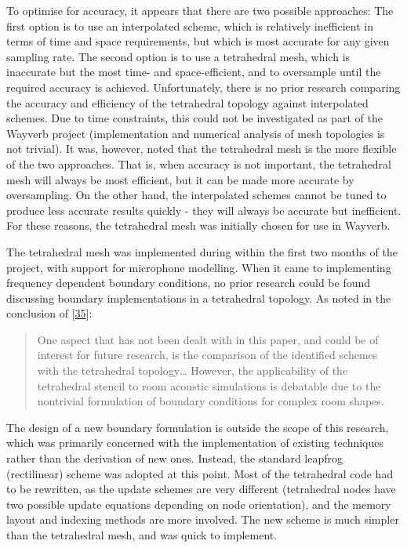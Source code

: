 \documentclass[]{scrreprt}
\begin{document}
To optimise for accuracy, it appears that there are two possible
approaches: The first option is to use an interpolated scheme, which is
relatively inefficient in terms of time and space requirements, but
which is most accurate for any given sampling rate. The second option is
to use a tetrahedral mesh, which is inaccurate but the most time- and
space-efficient, and to oversample until the required accuracy is
achieved. Unfortunately, there is no prior research comparing the
accuracy and efficiency of the tetrahedral topology against interpolated
schemes. Due to time constraints, this could not be investigated as part
of the Wayverb project (implementation and numerical analysis of mesh
topologies is not trivial). It was, however, noted that the tetrahedral
mesh is the more flexible of the two approaches. That is, when accuracy
is not important, the tetrahedral mesh will always be most efficient,
but it can be made more accurate by oversampling. On the other hand, the
interpolated schemes cannot be tuned to produce less accurate results
quickly - they will always be accurate but inefficient. For these
reasons, the tetrahedral mesh was initially chosen for use in Wayverb.

The tetrahedral mesh was implemented during within the first two months
of the project, with support for microphone modelling. When it came to
implementing frequency dependent boundary conditions, no prior research
could be found discussing boundary implementations in a tetrahedral
topology. As noted in the conclusion of
{[}\protect\hyperlink{ref-kowalczykux5froomux5f2011}{35}{]}:

\begin{quote}
One aspect that has not been dealt with in this paper, and could be of
interest for future research, is the comparison of the identified
schemes with the tetrahedral topology\ldots{} However, the applicability
of the tetrahedral stencil to room acoustic simulations is debatable due
to the nontrivial formulation of boundary conditions for complex room
shapes.
\end{quote}

The design of a new boundary formulation is outside the scope of this
research, which was primarily concerned with the implementation of
existing techniques rather than the derivation of new ones. Instead, the
standard leapfrog (rectilinear) scheme was adopted at this point. Most
of the tetrahedral code had to be rewritten, as the update schemes are
very different (tetrahedral nodes have two possible update equations
depending on node orientation), and the memory layout and indexing
methods are more involved. The new scheme is much simpler than the
tetrahedral mesh, and was quick to implement.
\end{document}
